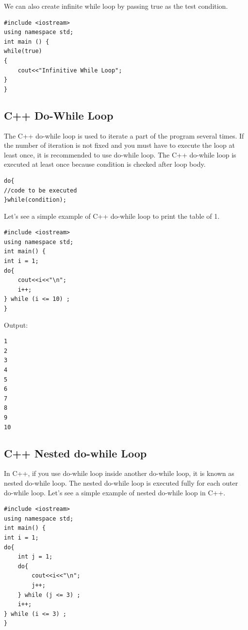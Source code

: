 \documentclass{book}
\begin{document}
We can also create infinite while loop by passing true as the test condition.

\begin{lstlisting}
#include <iostream>  
using namespace std;  
int main () {  
while(true)  
{    
	cout<<"Infinitive While Loop";    
}    
}
\end{lstlisting}

\subsection{C++ Do-While Loop}

The C++ do-while loop is used to iterate a part of the program several times. If the number of iteration is not fixed and you must have to execute the loop at least once, it is recommended to use do-while loop. The C++ do-while loop is executed at least once because condition is checked after loop body.

\begin{lstlisting}
do{    
//code to be executed    
}while(condition);  
\end{lstlisting}

Let's see a simple example of C++ do-while loop to print the table of 1.

\begin{lstlisting}
#include <iostream>  
using namespace std;  
int main() {  
int i = 1;    
do{    
	cout<<i<<"\n";    
	i++;    
} while (i <= 10) ;    
}  
\end{lstlisting}

Output:

\begin{lstlisting}
1
2
3
4
5
6
7
8
9
10
\end{lstlisting}

\subsection{C++ Nested do-while Loop}

In C++, if you use do-while loop inside another do-while loop, it is known as nested do-while loop. The nested do-while loop is executed fully for each outer do-while loop. Let's see a simple example of nested do-while loop in C++.

\begin{lstlisting}
#include <iostream>  
using namespace std;  
int main() {  
int i = 1;    
do{    
	int j = 1;          
	do{    
		cout<<i<<"\n";        
		j++;    
	} while (j <= 3) ;    
	i++;    
} while (i <= 3) ;     
}  
\end{lstlisting}
\end{document}
